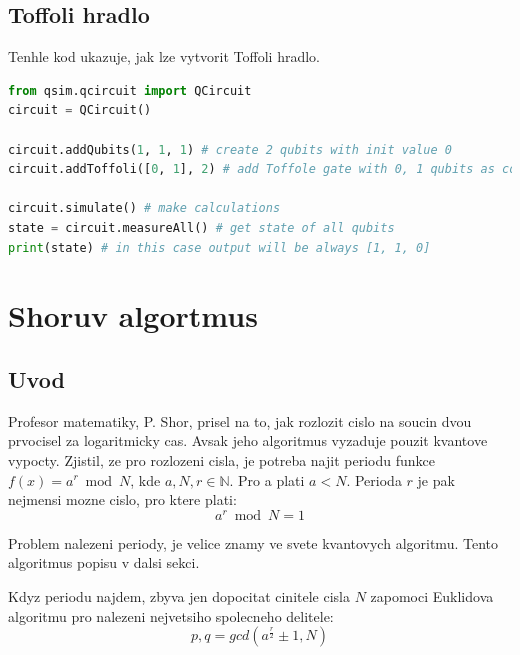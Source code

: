 \documentclass[11pt]{article}
\begin{document}
\subsection{Toffoli hradlo}
Tenhle kod ukazuje, jak lze vytvorit Toffoli hradlo.
\begin{lstlisting}[language=Python, caption=Toffoli gate]
from qsim.qcircuit import QCircuit
circuit = QCircuit()

circuit.addQubits(1, 1, 1) # create 2 qubits with init value 0
circuit.addToffoli([0, 1], 2) # add Toffole gate with 0, 1 qubits as control and 2 qubit as target

circuit.simulate() # make calculations
state = circuit.measureAll() # get state of all qubits
print(state) # in this case output will be always [1, 1, 0]
\end{lstlisting}

\newpage


\section{Shoruv algortmus}
\subsection{Uvod}
Profesor matematiky, P. Shor, prisel na to, jak rozlozit cislo na soucin dvou prvocisel za logaritmicky cas.
Avsak jeho algoritmus vyzaduje pouzit kvantove vypocty. Zjistil, ze pro rozlozeni cisla,
je potreba najit periodu funkce $f(x) = a^r \bmod N$, kde $a, N, r \in \mathbb{N}$.
Pro a plati $a < N$.
Perioda $r$ je pak nejmensi mozne cislo, pro ktere plati:
$$a^r \bmod N = 1$$
\par Problem nalezeni periody, je velice znamy ve svete kvantovych algoritmu. Tento algoritmus popisu v dalsi sekci.
\par Kdyz periodu najdem, zbyva jen dopocitat cinitele cisla $N$ zapomoci Euklidova algoritmu pro nalezeni nejvetsiho spolecneho delitele:
$$p, q = gcd(a^\frac{r}{2} \pm 1, N)$$
\end{document}

